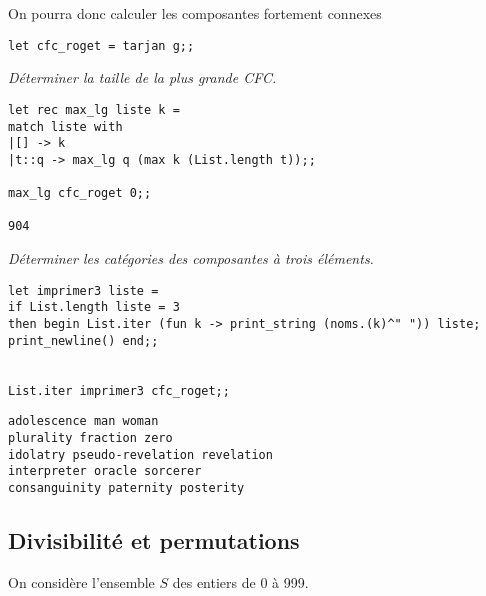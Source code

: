 On pourra donc calculer les composantes fortement connexes
\begin{lstlisting}
let cfc_roget = tarjan g;;
\end{lstlisting}
\begin{Exercise}\it 
Déterminer la taille de la plus grande CFC.
\end{Exercise} 
\begin{Answer}
\begin{lstlisting}
let rec max_lg liste k =
match liste with
|[] -> k
|t::q -> max_lg q (max k (List.length t));;

max_lg cfc_roget 0;;

904
\end{lstlisting}
\end{Answer} 
\begin{Exercise}\it 
Déterminer les catégories des composantes à trois éléments.
\end{Exercise} 
\begin{Answer}
\begin{lstlisting}
let imprimer3 liste = 
if List.length liste = 3
then begin List.iter (fun k -> print_string (noms.(k)^" ")) liste; 
print_newline() end;;


List.iter imprimer3 cfc_roget;;
\end{lstlisting}
\newpage

\begin{lstlisting}
adolescence man woman 
plurality fraction zero 
idolatry pseudo-revelation revelation 
interpreter oracle sorcerer 
consanguinity paternity posterity 
\end{lstlisting}
\end{Answer} 
\subsection{Divisibilité et permutations} 
On considère l'ensemble $S$ des entiers de 0 à 999.

